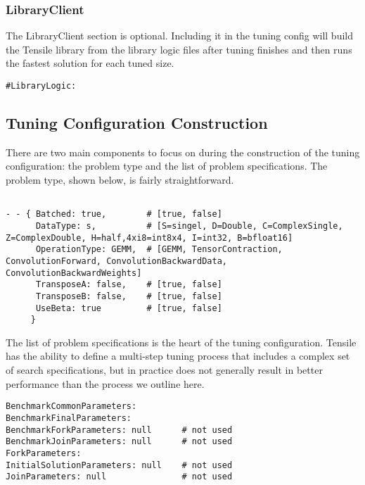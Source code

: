 \documentclass[]{article}
\begin{document}
\subsubsection{LibraryClient}
\label{sec:LibClient}

\noindent
The LibraryClient section is optional. Including it in the tuning config will build the Tensile library from the library logic files after tuning finishes and then runs the fastest solution for each tuned size.

\begin{verbatim}
#LibraryLogic:
\end{verbatim}


\subsection{Tuning Configuration Construction}

There are two main components to focus on during the construction of the tuning configuration: the problem type and the list of problem specifications. The problem type, shown below, is fairly straightforward.

\begin{verbatim}

- - { Batched: true,        # [true, false]
      DataType: s,          # [S=singel, D=Double, C=ComplexSingle, Z=ComplexDouble, H=half,4xi8=int8x4, I=int32, B=bfloat16]
      OperationType: GEMM,  # [GEMM, TensorContraction, ConvolutionForward, ConvolutionBackwardData, ConvolutionBackwardWeights]
      TransposeA: false,    # [true, false]
      TransposeB: false,    # [true, false]
      UseBeta: true         # [true, false]
     }

\end{verbatim}

The list of problem specifications is the heart of the tuning configuration. Tensile has the ability to define a multi-step tuning process that includes a complex set of search specifications, but in practice does not generally result in better performance than the process we outline here.
\begin{verbatim}
BenchmarkCommonParameters:
BenchmarkFinalParameters:
BenchmarkForkParameters: null      # not used
BenchmarkJoinParameters: null      # not used
ForkParameters:
InitialSolutionParameters: null    # not used
JoinParameters: null               # not used
\end{verbatim}
\end{document}
